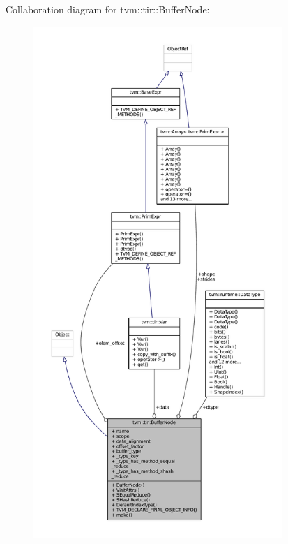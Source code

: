 Collaboration diagram for tvm\+:\+:tir\+:\+:Buffer\+Node\+:
\nopagebreak
\begin{figure}[H]
\begin{center}
\leavevmode
\includegraphics[height=550pt]{classtvm_1_1tir_1_1BufferNode__coll__graph}
\end{center}
\end{figure}
